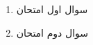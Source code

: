 \documentclass[a4paper,12pt,fleqn]{article}
\begin{document}
\thispagestyle{examheader}


\vspace*{3.5cm}

\begin{enumerate}
    \item {سوال اول امتحان}
    \item {سوال دوم امتحان}
\end{enumerate}
\end{document}
